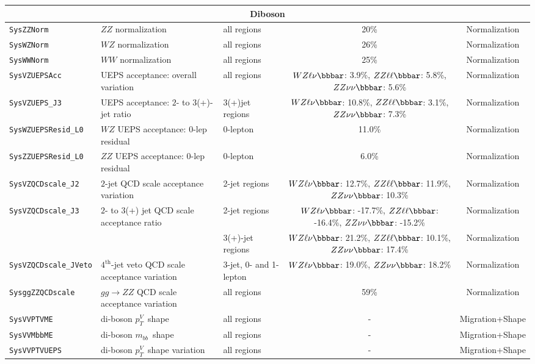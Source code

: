 \begin{table}
{\begin{tabular}{l|llcc}
\hline
\hline
\multicolumn{5}{c}{Diboson}\\
\hline
\texttt{SysZZNorm}    & $ZZ$ normalization 	&  all regions  & 20\%	&Normalization\\
\texttt{SysWZNorm}    & $WZ$ normalization 	&  all regions	& 26\%	&Normalization\\
\texttt{SysWWNorm}    & $WW$ normalization 	&  all regions	& 25\%	&Normalization\\
\hline
\texttt{SysVZUEPSAcc} & UEPS acceptance: overall variation &  all regions & $WZ\ell\nu\bbbar$: 3.9\%, $ZZ\ell\ell\bbbar$: 5.8\%, $ZZ\nu\nu\bbbar$: 5.6\% & Normalization\\
\texttt{SysVZUEPS\_J3} & UEPS acceptance: $2$- to $3$(+)-jet ratio & 3(+)jet regions & $WZ\ell\nu\bbbar$: 10.8\%, $ZZ\ell\ell\bbbar$: 3.1\%, $ZZ\nu\nu\bbbar$: 7.3\% & Normalization\\
\texttt{SysWZUEPSResid\_L0} & $WZ$ UEPS acceptance: $0$-lep residual & $0$-lepton & 11.0\% & Normalization\\
\texttt{SysZZUEPSResid\_L0} & $ZZ$ UEPS acceptance: $0$-lep residual & $0$-lepton & 6.0\% & Normalization\\
\texttt{SysVZQCDscale\_J2} & $2$-jet QCD scale acceptance variation & 2-jet regions & $WZ\ell\nu\bbbar$: 12.7\%, $ZZ\ell\ell\bbbar$: 11.9\%, $ZZ\nu\nu\bbbar$: 10.3\% & Normalization\\
\texttt{SysVZQCDscale\_J3}
            & $2$- to $3$(+) jet QCD scale acceptance ratio & 2-jet regions   & $WZ\ell\nu\bbbar$: -17.7\%, $ZZ\ell\ell\bbbar$: -16.4\%, $ZZ\nu\nu\bbbar$: -15.2\% & Normalization\\
                                                         &  & 3(+)-jet regions & $WZ\ell\nu\bbbar$: 21.2\%, $ZZ\ell\ell\bbbar$: 10.1\%, $ZZ\nu\nu\bbbar$: 17.4\% & Normalization\\
\texttt{SysVZQCDscale\_JVeto} & $4^{\text{th}}$-jet veto QCD scale acceptance variation & 3-jet, 0- and 1-lepton & $WZ\ell\nu\bbbar$: 19.0\%, $ZZ\nu\nu\bbbar$: 18.2\% & Normalization\\
\texttt{SysggZZQCDscale} & $gg\to ZZ$ QCD scale acceptance variation & all regions & 59\% & Normalization\\
\hline
\texttt{SysVVPTVME} & di-boson $p_T^V$\ shape & all regions & - & Migration+Shape \\ 
\texttt{SysVVMbbME} & di-boson $m_{bb}$\ shape & all regions & - & Migration+Shape \\ 
\texttt{SysVVPTVUEPS} & di-boson $p_T^V$\ shape variation & all regions & - & Migration+Shape \\

\end{tabular}}
\end{table}
